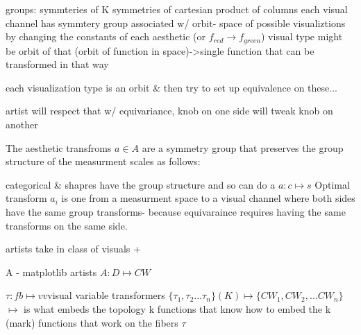groups:
symmteries of K
symmetries of cartesian product of columns
each visual channel has symmtery group associated w/
orbit- space of possible visualiztions by changing the constants of each aesthetic (or $f_{red} \rightarrow f_{green}$)  
visual type might be orbit of that (orbit of function in space)->single function that can be transformed in that way 

each visualization type is an orbit \& then try to set up equivalence on these...

artist will respect that w/ equivariance, knob on one side will tweak knob on another



The aesthetic transfroms $a \in A$ are a symmetry group that preserves the group structure of the measurment scales as follows: 

categorical \& shapres have the group structure and so can do a $a: c \mapsto s$
Optimal transform $a_{i}$ is one from a measurment space to a visual channel where both sides have the same group transforms-
because equivaraince requires having the same transforms on the same side. 

artists take in class of visuals + 

A - matplotlib artists 
$A: D \mapsto CW$

$\tau: fb \mapsto vv $visual variable transformers
$\{\tau_{1}, \tau_{2}...\tau_{n}\}(K)\mapsto \{CW_{1}, CW_{2}, ...CW_{n}\}$ 
$\mapsto$ is what embeds the topology k 
functions that know how to embed the k (mark)
functions that work on the fibers $\tau$

